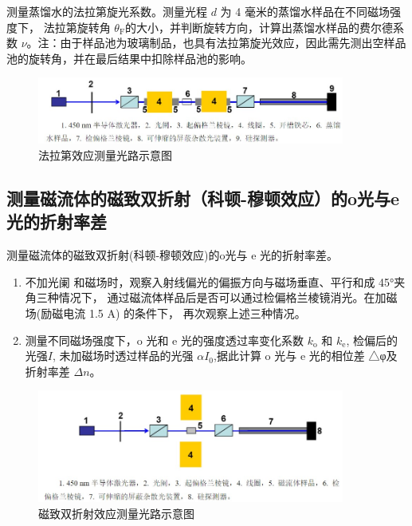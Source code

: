 \documentclass[a4paper,UTF8]{ctexart}
\begin{document}
测量蒸馏水的法拉第旋光系数。测量光程 $d$ 为 4 毫米的蒸馏水样品在不同磁场强度下， 法拉第旋转角 $\theta_\mathrm{F}$的大小，并判断旋转方向，计算出蒸馏水样品的费尔德系数 $\nu$。注：由于样品池为玻璃制品，也具有法拉第旋光效应，因此需先测出空样品池的旋转角，并在最后结果中扣除样品池的影响。



\begin{figure}[H]
    \centering
    \begin{minipage}[b]{0.9\textwidth}
        \centering
        \includegraphics[width=0.9\textwidth]{./fig2.jpg}
        \caption{法拉第效应测量光路示意图}
    \end{minipage}
\end{figure}

\subsection{测量磁流体的磁致双折射（科顿-穆顿效应）的o光与e光的折射率差}

测量磁流体的磁致双折射(科顿-穆顿效应)的o光与 e 光的折射率差。

\begin{enumerate}
    \item 不加光阑
 和磁场时，观察入射线偏光的偏振方向与磁场垂直、平行和成 45°夹角三种情况下，
 通过磁流体样品后是否可以通过检偏格兰棱镜消光。在加磁场(励磁电流 1.5 A) 的条件下，
 再次观察上述三种情况。
    \item 测量不同磁场强度下，o 光和 e 光的强度透过率变化系数 
 $k_\mathrm{o}$ 和 $k_\mathrm{e}$, 检偏后的光强$I$,
 未加磁场时透过样品的光强 $\alpha I_0$,据此计算 o 光与 e 光的相位差 △φ及折射率差 $\Delta n$。
\end{enumerate}



\begin{figure}[H]
    \centering
    \begin{minipage}[b]{0.9\textwidth}
        \centering
        \includegraphics[width=0.9\textwidth]{./fig3.jpg}
        \caption{磁致双折射效应测量光路示意图}
    \end{minipage}
\end{figure}
\end{document}

